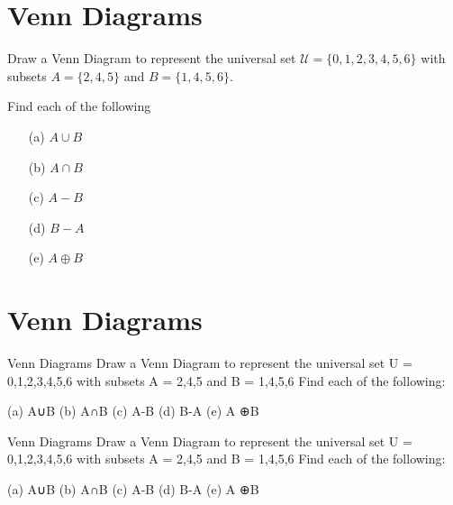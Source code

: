 \newpage
\section*{Venn Diagrams}
Draw a Venn Diagram to represent the universal set
$\mathcal{U} = \{0,1,2,3,4,5,6\}$ with subsets
$A = \{2,4,5\}$ and 
$B = \{1,4,5,6\}$.

\noindent Find each of the following
\begin{itemize}
\item[(a)] $A \cup B $
\item[(b)] $A \cap B $
\item[(c)] $A-B$
\item[(d)] $B-A$
\item[(e)] $A \oplus B$
\end{itemize}
\newpage
\section*{Venn Diagrams}

Venn Diagrams
Draw a Venn Diagram to represent the universal set U = {0,1,2,3,4,5,6} with subsets
A = {2,4,5} and  B = {1,4,5,6}
Find each of the following:
 
(a) A∪B
(b) A∩B
(c) A-B
(d) B-A
(e) A ⊕B
 
 
 Venn Diagrams
 Draw a Venn Diagram to represent the universal set U = {0,1,2,3,4,5,6} with subsets
 A = {2,4,5} and  B = {1,4,5,6}
 Find each of the following:
 
 (a) A∪B
 (b) A∩B
 (c) A-B
 (d) B-A
 (e) A ⊕B
